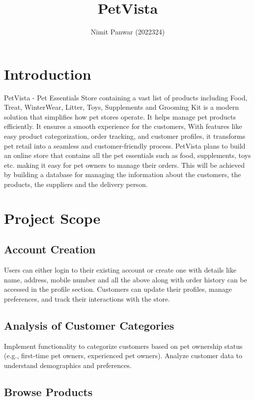 \documentclass{article}
\title{PetVista}
\author{Nimit Panwar (2022324)}
\begin{document}
\maketitle

\section{Introduction}

PetVista -  Pet Essentials Store containing a vast list of products including Food, Treat, WinterWear, Litter, Toys, Supplements and Grooming Kit is a modern solution that simplifies how pet stores operate. It helps manage pet products efficiently. It ensures a smooth experience for the customers, With features like easy product categorization, order tracking, and customer profiles, it transforms pet retail into a seamless and customer-friendly process. PetVista plans to build an online store that contains all the pet essentials such as food, supplements, toys etc. making it easy for pet owners to manage their orders. This will be achieved by building a database for managing the information about the customers, the products, the suppliers and the delivery person.

\section{Project Scope}

\subsection{Account Creation}

Users can either login to their existing account or create one with details like name, address, mobile number and all the above along with order history can be accessed in the profile section. Customers can update their profiles, manage preferences, and track their interactions with the store.

\subsection{Analysis of Customer Categories}

Implement functionality to categorize customers based on pet ownership status (e.g., first-time pet owners, experienced pet owners). Analyze customer data to understand demographics and preferences.

\subsection{Browse Products}
\end{document}
